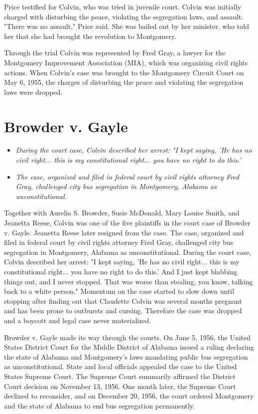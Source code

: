Price testified for Colvin, who was tried in juvenile court. Colvin was
initially charged with disturbing the peace, violating the segregation
laws, and assault. "There was no assault," Price said. She was bailed
out by her minister, who told her that she had brought the revolution to
Montgomery.

Through the trial Colvin was represented by Fred Gray, a lawyer for the
Montgomery Improvement Association (MIA), which was organizing civil
rights actions. When Colvin's case was brought to the Montgomery Circuit
Court on May 6, 1955, the charges of disturbing the peace and violating
the segregation laws were dropped.

\section{Browder v. Gayle}\label{browder-v.-gayle}

\begin{itemize}
\item
  \emph{During the court case, Colvin described her arrest: "I kept
  saying, 'He has no civil right... this is my constitutional right...
  you have no right to do this.'}
\item
  \emph{The case, organized and filed in federal court by civil rights
  attorney Fred Gray, challenged city bus segregation in Montgomery,
  Alabama as unconstitutional.}
\end{itemize}

Together with Aurelia S. Browder, Susie McDonald, Mary Louise Smith, and
Jeanetta Reese, Colvin was one of the five plaintiffs in the court case
of Browder v. Gayle. Jeanetta Reese later resigned from the case. The
case, organized and filed in federal court by civil rights attorney Fred
Gray, challenged city bus segregation in Montgomery, Alabama as
unconstitutional. During the court case, Colvin described her arrest: "I
kept saying, 'He has no civil right... this is my constitutional
right... you have no right to do this.' And I just kept blabbing things
out, and I never stopped. That was worse than stealing, you know,
talking back to a white person." Momentum on the case started to slow
down until stopping after finding out that Claudette Colvin was several
months pregnant and has been prone to outbursts and cursing. Therefore
the case was dropped and a boycott and legal case never materialized.

Browder v. Gayle made its way through the courts. On June 5, 1956, the
United States District Court for the Middle District of Alabama issued a
ruling declaring the state of Alabama and Montgomery's laws mandating
public bus segregation as unconstitutional. State and local officials
appealed the case to the United States Supreme Court. The Supreme Court
summarily affirmed the District Court decision on November 13, 1956. One
month later, the Supreme Court declined to reconsider, and on December
20, 1956, the court ordered Montgomery and the state of Alabama to end
bus segregation permanently.

